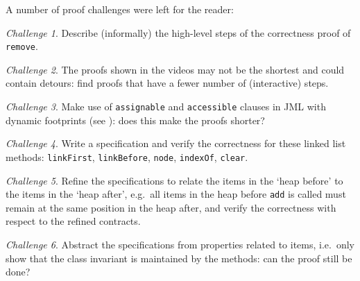 \documentclass[runningheads]{llncs}
\theoremstyle{remark}
\newtheorem{challenge}{Challenge}
\begin{document}
A number of proof challenges were left for the reader:

\begin{challenge}
Describe (informally) the high-level steps of the correctness proof of \texttt{remove}.
\end{challenge}

\begin{challenge}
The proofs shown in the videos may not be the shortest and could contain detours: find proofs that have a fewer number of (interactive) steps.
\end{challenge}

\begin{challenge}
Make use of \texttt{assignable} and \texttt{accessible} clauses in JML with dynamic footprints (see \cite[Section 9.3]{KeYbook}): does this make the proofs shorter?
\end{challenge}

\begin{challenge}
Write a specification and verify the correctness for these linked list methods: \texttt{linkFirst}, \texttt{linkBefore}, \texttt{node}, \texttt{indexOf}, \texttt{clear}.
\end{challenge}

\begin{challenge}
Refine the specifications to relate the items in the `heap before' to the items in the `heap after', e.g.~all items in the heap before \texttt{add} is called must remain at the same position in the heap after, and verify the correctness with respect to the refined contracts.
\end{challenge}

\begin{challenge}
Abstract the specifications from properties related to items, i.e.~only show that the class invariant is maintained by the methods: can the proof still be done?
\end{challenge}




\end{document}
